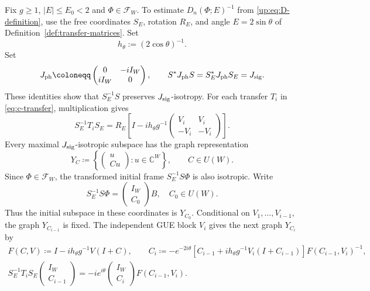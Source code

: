 \documentclass[11pt]{article}
\numberwithin{equation}{section}
\theoremstyle{remark}
\newcommand{\C}{\mathbb C}
\begin{document}
Fix $g\ge1$, $|E|\le E_0<2$ and $\Phi\in\mathcal F_W$. To estimate
$D_n(\Phi;E)^{-1}$ from \eqref{up:eq:D-definition}, use the free
coordinates $S_E$, rotation $R_E$, and angle $E=2\sin\theta$ of
Definition~\ref{def:transfer-matrices}. Set
\begin{equation}\label{lg:eq:normal}
 h_\theta:=(2\cos\theta)^{-1}.
\end{equation}
Set
\[
 J_{\rm ph}\coloneqq\begin{pmatrix}0&-iI_W\\iI_W&0\end{pmatrix},
 \qquad S^*J_{\rm ph}S=S_E^*J_{\rm ph}S_E=J_{\rm sig}.
\]
These identities show that $S_E^{-1}S$ preserves $J_{\rm sig}$-isotropy.
For each transfer $T_i$ in \eqref{eq:c-transfer}, multiplication gives
\[
 S_E^{-1}T_iS_E=R_E
 \left[I-ih_\theta g^{-1}\begin{pmatrix}V_i&V_i\\-V_i&-V_i\end{pmatrix}\right].
\]
Every maximal $J_{\rm sig}$-isotropic subspace has the graph representation
\begin{equation}\label{up:eq:graph-subspace}
 Y_C\coloneqq\left\{\begin{pmatrix}u\\Cu\end{pmatrix}:u\in\C^W\right\},
 \qquad C\in U(W).
\end{equation}
Since $\Phi\in\mathcal F_W$, the transformed
initial frame $S_E^{-1}S\Phi$ is also isotropic. Write
\[
 S_E^{-1}S\Phi=\begin{pmatrix}I_W\\C_0\end{pmatrix}B, \quad C_0\in U(W).
\]
Thus the initial subspace in these coordinates is $Y_{C_0}$.
Conditional on $V_1,\ldots,V_{i-1}$, the graph $Y_{C_{i-1}}$ is fixed.
The independent GUE block $V_i$ gives the next graph $Y_{C_i}$ by
\begin{equation}\label{lg:eq:matrix-update}
 \begin{gathered}
 F(C,V)\coloneqq I-ih_\theta g^{-1}V(I+C),\qquad
 C_i\coloneqq -e^{-2i\theta}[C_{i-1}+ih_\theta g^{-1}V_i(I+C_{i-1})]F(C_{i-1},V_i)^{-1},\\
 S_E^{-1}T_iS_E\begin{pmatrix}I_W\\C_{i-1}\end{pmatrix}
 =-ie^{i\theta}\begin{pmatrix}I_W\\C_i\end{pmatrix}F(C_{i-1},V_i).
 \end{gathered}
\end{equation}
\end{document}
